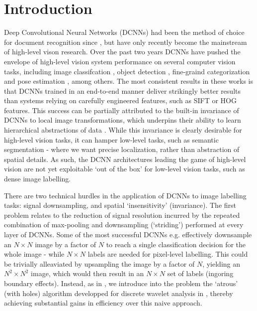 \section{Introduction}
\label{sec:intro}
Deep Convolutional Neural Networks (DCNNs) had been the method of choice for document recognition since  \citet{LeCun1998}, but 
have only recently become the mainstream of high-level vison research.
Over the past two years  DCNNs have pushed the envelope of high-level vision system performance on several computer vision tasks, including image classifcation \citet{KrizhevskyNIPS2013, papandreou2014untangling, sermanet2013overfeat, simonyan2014very, szegedy2014going}, object detection \citet{girshick2014rcnn}, fine-graind categorization \citet{zhang2014part} and pose estimation \citet{chen2014articulated, tompson2014joint}, among others.
The most consistent results in these works is that DCNNs trained in an end-to-end manner  deliver  strikingly better results than systems relying on carefully engineered features, such as SIFT or HOG features.
This success can be partially attributed to the built-in  invariance of DCNNs to local image transformations, which underpins their ability to learn hierarchical abstractions of data \citep{zeiler2014visualizing}. While this invariance is clearly desirable for high-level vision tasks, it can hamper low-level tasks, such as semantic segmentation - where we want precise localization, rather than abstraction of spatial details.  As such, the DCNN architectures leading the game of high-level vision are not yet exploitable `out of the box' for low-level vision tasks, such as dense image labelling. 



There are two technical hurdles in the application of DCNNs to image labelling tasks: signal downsampling, and spatial `insensitivity' (invariance). 
The first problem relates to the reduction of signal resolution incurred by the repeated combination of max-pooling and downsampling (`striding') performed at every layer of DCNNs.  Some of the most successful  DCNNs e.g. 
\citep{KrizhevskyNIPS2013, simonyan2014very, szegedy2014going}
effectively downsample an $N\times N$ image by a factor of $N$ to reach 
a single  classification decision for the whole image - while $N \times N$ labels are needed for pixel-level labelling. This could  be trivially alleaviated by upsampling the image by a factor of $N$, yielding an $N^2\times N^2$ image, which would then result in an $N\times N$ set of labels (ingoring boundary effects). Instead, as in  \cite{papandreou2014untangling}, we introduce into the problem the `atrous' (with holes) algorithm developped for  discrete wavelet analysis in  \cite{Mall99}, thereby achieving substantial gains in efficiency over this naive approach. 

